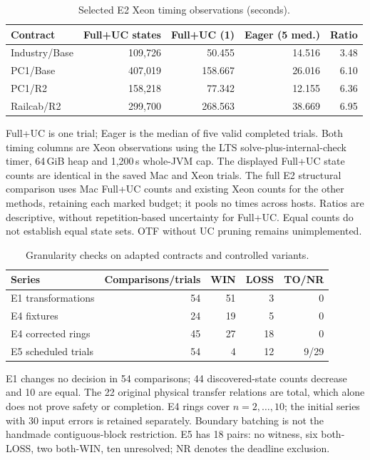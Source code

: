 \begin{table}[p]
\centering\small
\caption{Selected E2 Xeon timing observations (seconds).}
\label{tab:vthree-e2-timing}
\setlength{\tabcolsep}{3pt}
\begin{tabular}{lrrrr}
\toprule
Contract & Full+UC states & Full+UC (1) & Eager (5 med.) & Ratio \\
\midrule
Industry/Base & 109,726 & 50.455 & 14.516 & 3.48 \\
PC1/Base & 407,019 & 158.667 & 26.016 & 6.10 \\
PC1/R2 & 158,218 & 77.342 & 12.155 & 6.36 \\
Railcab/R2 & 299,700 & 268.563 & 38.669 & 6.95 \\
\bottomrule
\end{tabular}
\par\smallskip\footnotesize Full+UC is one trial; Eager is the median of five valid completed trials. Both timing columns are Xeon observations using the LTS solve-plus-internal-check timer, 64\,GiB heap and 1,200\,s whole-JVM cap. The displayed Full+UC state counts are identical in the saved Mac and Xeon trials. The full E2 structural comparison uses Mac Full+UC counts and existing Xeon counts for the other methods, retaining each marked budget; it pools no times across hosts. Ratios are descriptive, without repetition-based uncertainty for Full+UC. Equal counts do not establish equal state sets. OTF without UC pruning remains unimplemented.
\end{table}

\begin{table}[p]
\centering\small
\caption{Granularity checks on adapted contracts and controlled variants.}
\label{tab:vthree-granularity}
\setlength{\tabcolsep}{3pt}
\begin{tabular}{lrrrr}
\toprule
Series & Comparisons/trials & WIN & LOSS & TO/NR \\
\midrule
E1 transformations & 54 & 51 & 3 & 0 \\
E4 fixtures & 24 & 19 & 5 & 0 \\
E4 corrected rings & 45 & 27 & 18 & 0 \\
E5 scheduled trials & 54 & 4 & 12 & 9/29 \\
\bottomrule
\end{tabular}
\par\smallskip\footnotesize E1 changes no decision in 54 comparisons; 44 discovered-state counts decrease and 10 are equal. The 22 original physical transfer relations are total, which alone does not prove safety or completion. E4 rings cover $n=2,\ldots,10$; the initial series with 30 input errors is retained separately. Boundary batching is not the handmade contiguous-block restriction. E5 has 18 pairs: no witness, six both-LOSS, two both-WIN, ten unresolved; NR denotes the deadline exclusion.
\end{table}

